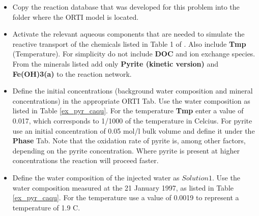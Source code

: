 \begin{itemize}



\item Copy the reaction database that was developed for this problem into the folder where the ORTI model is located. 

\item Activate the relevant aqueous components that are needed to simulate the reactive transport of the chemicals listed in Table 1 of \cite{prommer_stuyfzand_2005}. Also include  {\color{red} \textbf{Tmp}} (Temperature). 
For simplicity do not include  {\color{red} \textbf{DOC}} and ion exchange species. 
From the minerals listed add only  {\color{red} \textbf{Pyrite (kinetic version)}} 
and \\ {\color{red} \textbf{Fe(OH)3(a)}} to the reaction network.  

\item Define the initial concentrations (background water composition and mineral concentrations)
in the appropriate ORTI Tab. Use the 
water composition as listed in Table \ref{ex_pyr_caqu}.
For the temperature {\color{red} \textbf{Tmp}} enter a value of 0.017, which
corresponds to 1/1000 of the temperature in Celcius. 
For pyrite use an initial concentration of 0.05 mol/l bulk volume and define 
it under the {\color{blue} \textbf{Phase}} Tab.
Note that the oxidation rate of pyrite is, among other factors, depending on the 
pyrite concentration. Where pyrite is present at higher concentrations the reaction
will proceed faster. 

\item Define the water composition of the injected water as $Solution 1$.
Use the water composition measured at the 21 January 1997, as
listed in Table \ref{ex_pyr_caqu}. For the temperature use a
value of 0.0019 to represent a temperature of 1.9 C. 


\end{itemize}
